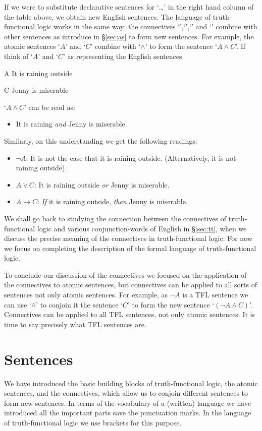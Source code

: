 If we were to substitute declarative sentences for `\dots' in the right hand column of the table above, we obtain new English sentences. The language of truth-functional logic works in the same way: the connectives `\enot',`\eand',`\eor' and `\eif' combine with other sentences as introduce in \S\ref{sec:as} to form new sentences. For example, the atomic sentences `$A$' and `$C$' combine
with `$\wedge$' to form the sentence `$A\wedge C$'. If think of `$A$' and `$C$' as representing the English sentences
\begin{ekey}
		\item[A] It is raining outside
		\item[C] Jenny is miserable
	\end{ekey}
`$A\wedge C$' can be read as:
\begin{itemize}
\item It is raining \emph{and} Jenny is miserable.
\end{itemize}
Similarly, on this understanding we get the following readings:
\begin{itemize}
\item $\neg A$: It is not the case that it is raining outside. (Alternatively, it is not raining outside).
\item $A\vee C$: It is raining outside \emph{or} Jenny is miserable.
\item $A\rightarrow C$: \emph{If} it is raining outside, \emph{then} Jenny is miserable.
 \end{itemize}
 We shall go back to studying the connection between the connectives of truth-functional logic and various conjunction-words of English in \S\ref{sec:tt}, when we discuss the precise meaning of the connectives in truth-functional logic. For now we focus on completing the description of the formal language of truth-functional logic.
 
 To conclude our discussion of the connectives we focused on the application of the connectives to atomic sentences, but connectives can be applied to all sorts of sentences not only atomic sentences. For example, as $\neg A$ is a TFL sentence we can use `$\wedge$' to conjoin it the sentence `$C$' to form the new sentence `$(\neg A\wedge C)$'. Connectives can be applied to all TFL sentences, not only atomic sentences. It is time to say precisely what TFL sentences are.
 
\section{Sentences}\label{s:TFLSentences}
We have introduced the basic building blocks of truth-functional logic, the atomic sentences, and the connectives, which allow us to conjoin different sentences to form new sentences. In terms of the vocabulary of a (written) language we have introduced all the important parts save the punctuation marks. In the language of truth-functional logic we use brackets for this purpose.

